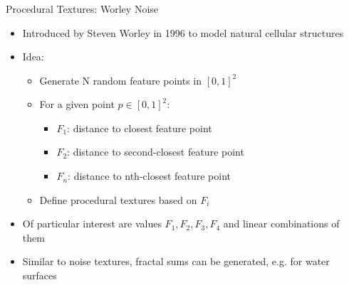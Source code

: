 \documentclass[utf8,stillsansserifmath,fleqn,t]{beamer}
\begin{document}
\begin{frame}
\frametitle{\insertsection}
Procedural Textures: Worley Noise
\begin{itemize}
\item Introduced by Steven Worley in 1996 to model natural cellular structures
\item Idea:
    \begin{itemize}
    \item Generate N random feature points in $[0,1]^2$
    \item For a given point $p\in [0,1]^2$:
        \begin{itemize}
        \item $F_1$: distance to closest feature point
        \item $F_2$: distance to second-closest feature point
        \item $F_n$: distance to nth-closest feature point
        \end{itemize}
    \item Define procedural textures based on $F_i$
    \end{itemize}
\item Of particular interest are values $F_1, F_2, F_3, F_4$ and linear
combinations of them
\item Similar to noise textures, fractal sums can be generated, e.g.
for water surfaces
\end{itemize}
\end{frame}
\end{document}
